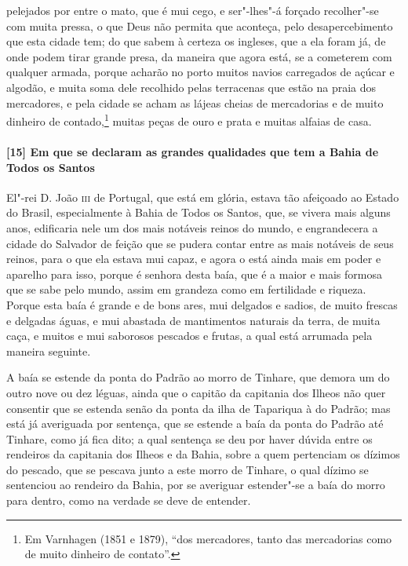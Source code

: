\begin{linenumbers}
pelejados por entre o mato, que é mui cego, e ser"-lhes"-á forçado recolher"-se com muita
pressa, o que Deus não permita que aconteça, pelo desapercebimento que esta cidade tem; do
que sabem à certeza os ingleses, que a ela foram já, de onde podem tirar grande presa, da
maneira que agora está, se a cometerem com qualquer armada, porque acharão no porto muitos
navios carregados de açúcar e algodão, e muita soma dele recolhido pelas terracenas que
estão na praia dos mercadores, e pela cidade se acham as lájeas cheias de mercadorias e de
muito dinheiro de contado,\footnote{ Em Varnhagen (1851 e 1879), ``dos mercadores, tanto
das mercadorias como de muito dinheiro de contato''.} muitas peças de ouro e prata e
muitas alfaias de casa.

\paragraph{[15] Em que se declaram as grandes qualidades que tem a Bahia de Todos os Santos} \quad
El"-rei D. João \textsc{iii} de Portugal, que está em glória, estava tão afeiçoado ao
Estado do Brasil, especialmente à Bahia de Todos os Santos, que, se vivera mais alguns
anos, edificaria nele um dos mais notáveis reinos do mundo, e engrandecera a cidade do
Salvador de feição que se pudera contar entre as mais notáveis de seus reinos, para o que
ela estava mui capaz, e agora o está ainda mais em poder e aparelho para isso, porque é
senhora desta baía, que é a maior e mais formosa que se sabe pelo mundo, assim em grandeza
como em fertilidade e riqueza. Porque esta baía é grande e de bons ares, mui delgados e
sadios, de muito frescas e delgadas águas, e mui abastada de mantimentos naturais da
terra, de muita caça, e muitos e mui saborosos pescados e frutas, a qual está arrumada
pela maneira seguinte.

A baía se estende da ponta do Padrão ao morro de Tinhare, que demora um do outro nove ou
dez léguas, ainda que o capitão da capitania dos Ilheos não quer consentir que se estenda
senão da ponta da ilha de Tapariqua à do Padrão; mas está já averiguada por sentença, que
se estende a baía da ponta do Padrão até Tinhare, como já fica dito; a qual sentença se
deu por haver dúvida entre os rendeiros da capitania dos Ilheos e da Bahia, sobre a quem
pertenciam os dízimos do pescado, que se pescava junto a este morro de Tinhare, o qual
dízimo se sentenciou ao rendeiro da Bahia, por se averiguar estender"-se a baía do morro
para dentro, como na verdade se deve de entender.


\end{linenumbers}
